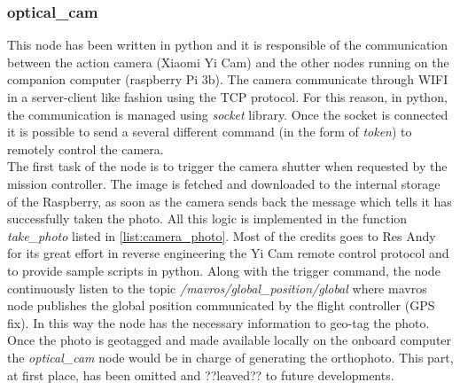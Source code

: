 \subsubsection{optical\_cam} %
\label{ssub:optical_cam}
This node has been written in python and it is responsible of the communication between the action camera (Xiaomi Yi Cam) and the other nodes running on the companion computer (raspberry Pi 3b). The camera communicate through WIFI in a server-client like fashion using the TCP protocol. For this reason, in python, the communication is managed using \textit{socket} library.
Once the socket is connected it is possible to send a several different command (in the form of \textit{token}) to remotely control the camera.\\
The first task of the node is to trigger the camera shutter when requested by the mission controller. The image is fetched and downloaded to the internal storage of the Raspberry, as soon as the camera sends back the message which tells it has successfully taken the photo. All this logic is implemented in the function \textit{take\_photo} listed in \autoref{list:camera_photo}. Most of the credits goes to Res Andy for its great effort in reverse engineering the Yi Cam remote control protocol and to provide sample scripts in python. \cite{YiCamGit}
Along with the trigger command, the node continuously listen to the topic \textit{/mavros/global\_position/global} where mavros node publishes the global position communicated by the flight controller (GPS fix). In this way the node has the necessary information to geo-tag the photo.
Once the photo is geotagged and made available locally on the onboard computer the \textit{optical\_cam} node would be in charge of generating the orthophoto. This part, at first place, has been omitted and ??leaved?? to future developments.


